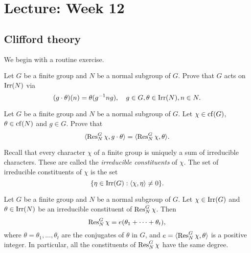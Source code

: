 \section{Lecture: Week 12}

\subsection{Clifford theory}

We begin with a routine exercise. 


\begin{exercise}
\label{xca:conjugate_chars1}
Let $G$ be a finite group and $N$ be a normal subgroup
of $G$. Prove that $G$ acts on $\operatorname{Irr}(N)$ via 
\[
(g\cdot\theta)(n)=\theta(g^{-1}ng),\quad 
g\in G,\theta\in\operatorname{Irr}(N),n\in N.
\]
\end{exercise}

\begin{exercise}
\label{xca:conjugate_chars2}
Let $G$ be a finite group and $N$ be a normal subgroup of $G$. 
Let $\chi\in\operatorname{cf}(G)$, $\theta\in\operatorname{cf}(N)$ and $g\in G$. Prove that
\[
\langle\operatorname{Res}_N^G\chi,g\cdot\theta\rangle=\langle\operatorname{Res}_N^G\chi,\theta\rangle.
\]
\end{exercise}

Recall that every character $\chi$ of a finite group is uniquely 
a sum of irreducible characters. These are called
the \emph{irreducible constituents} of $\chi$. The set 
of irreducible constituents of $\chi$ is the set  
\[
\{\eta\in\operatorname{Irr}(G):\langle\chi,\eta\rangle\ne0\}.
\]

\begin{theorem}[Clifford]
\label{thm:Clifford}
    Let $G$ be a finite group and $N$ be a normal
    subgroup of $G$. Let $\chi\in\operatorname{Irr}(G)$ and $\theta\in\operatorname{Irr}(N)$ be 
    an irreducible constituent of $\operatorname{Res}_N^G\chi$. 
    Then 
    \[
    \operatorname{Res}_N^G\chi = e(\theta_1+\cdots+\theta_t),
    \]
    where $\theta=\theta_1,\dots,\theta_t$ are the conjugates 
    of $\theta$ in $G$, 
    and $e=\langle\operatorname{Res}_N^G\chi,\theta\rangle$ is a positive integer. In particular, all the constituents of $\operatorname{Res}_N^G\chi$ have the same degree. 
\end{theorem}

